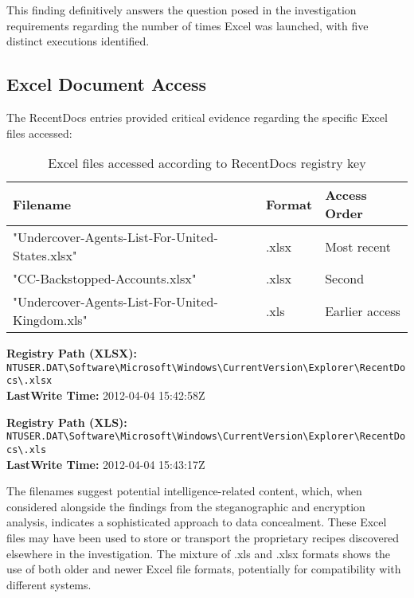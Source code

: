 This finding definitively answers the question posed in the investigation requirements regarding the number of times Excel was launched, with five distinct executions identified.

\subsection{Excel Document Access}
The RecentDocs entries provided critical evidence regarding the specific Excel files accessed:

\begin{table}[h]
    \centering
    \begin{tabular}{|p{7cm}|p{3cm}|p{3cm}|}
        \hline
        \textbf{Filename} & \textbf{Format} & \textbf{Access Order} \\
        \hline
        "Undercover-Agents-List-For-United-States.xlsx" & .xlsx & Most recent \\
        \hline
        "CC-Backstopped-Accounts.xlsx" & .xlsx & Second \\
        \hline
        "Undercover-Agents-List-For-United-Kingdom.xls" & .xls & Earlier access \\
        \hline
    \end{tabular}
    \caption{Excel files accessed according to RecentDocs registry key}
    \label{tab:excel_files}
\end{table}

\textbf{Registry Path (XLSX):} \texttt{NTUSER.DAT\textbackslash Software\textbackslash Microsoft\textbackslash Windows\textbackslash CurrentVersion\textbackslash Explorer\textbackslash RecentDocs\textbackslash .xlsx}\\
\textbf{LastWrite Time:} 2012-04-04 15:42:58Z

\textbf{Registry Path (XLS):} \texttt{NTUSER.DAT\textbackslash Software\textbackslash Microsoft\textbackslash Windows\textbackslash CurrentVersion\textbackslash Explorer\textbackslash RecentDocs\textbackslash .xls}\\
\textbf{LastWrite Time:} 2012-04-04 15:43:17Z

The filenames suggest potential intelligence-related content, which, when considered alongside the findings from the steganographic and encryption analysis, indicates a sophisticated approach to data concealment. These Excel files may have been used to store or transport the proprietary recipes discovered elsewhere in the investigation. The mixture of .xls and .xlsx formats shows the use of both older and newer Excel file formats, potentially for compatibility with different systems.

